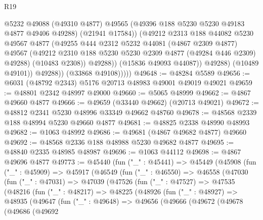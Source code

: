 \begin{lexlean}{R19}
\begin{coremodule}
                          @5232
                          @49088
                          (@49310 @4877)
                          @49565
                          (@49396 @188 @5230 @5230 @49183 @4877 @49406 @49288)
                          (@21941 @17584))
                        (@49212
                          @2313
                          @188
                          @44082
                          @5230
                          @49567
                          @4877
                          (@49255
                            @444
                            @2312
                            @5232
                            @44081
                            (@4867 @2309 @4877)
                            @49567
                            (@49212 @2310 @188 @5230 @5230 @2309 @4877 (@49284 @446 @2309) @49288)
                            (@10483 @2308))
                          @49288))
                      (@15836 @49093 @44087))
                    @49288)
                  (@10489 @49101))
                @49288))
            (@33868 @49108)))))
@49648 := @48284 @5589
@49656 := @6031 (@48792 @2343) @5176 @20713 @48983 @49001 @49019 @49021
@49659 := @48801 @2342 @48997 @49000
@49660 := @5065 @48999
@49662 := @4867 @49660 @4877
@49666 := @49659 (@33440 @49662) (@20713 @49021)
@49672 := @48812 @2341 @5230 @48996 @33349 @49662 @48760
@49678 := @48568 @2339 @188 @48994 @5230 @49660 @4877
@49681 := @48825 @2338 @48990 @48993
@49682 := @1063 @48992
@49686 := @49681 (@4867 @49682 @4877) @49660
@49692 := @48568 @2336 @188 @48988 @5230 @49682 @4877
@49695 := @48840 @2335 @48985 @48987
@49696 := @1063 @44112
@49698 := @4867 @49696 @4877
@49773 := @45440
    (fun ("_" : @45441) =>
    @45449
      (@45908
        (fun ("_" : @45909) =>
        @45917
          (@46549
            (fun ("_" : @46550) =>
            @46558
              (@47030
                (fun ("_" : @47031) =>
                @47039
                  (@47526
                    (fun ("_" : @47527) =>
                    @47535
                      (@48216
                        (fun ("_" : @48217) =>
                        @48225
                          (@48926
                            (fun ("_" : @48927) =>
                            @48935
                              (@49647
                                (fun ("_" : @49648) =>
                                @49656
                                  (@49666
                                    (@49672
                                      (@49678
                                        (@49686
                                          (@49692

\end{coremodule}
\end{lexlean}
